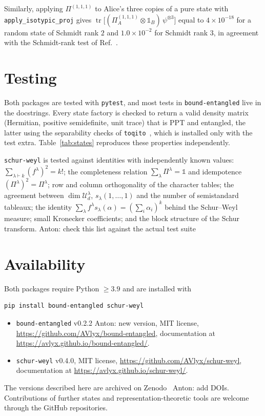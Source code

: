 \documentclass[aps,pra,twocolumn,superscriptaddress,groupedaddress]{revtex4-2}
\newcommand{\one}{\mathds{1}}
\newcommand{\code}[1]{\texttt{#1}}
\DeclareMathOperator{\tr}{tr}
\newcommand{\anton}[1]{{\color{antongreen} Anton: #1}}
\begin{document}
Similarly, applying $\Pi^{(1,1,1)}$ to Alice's three copies of a pure state
with \code{apply\_isotypic\_proj} gives
$\tr\big[(\Pi^{(1,1,1)}_A\otimes\one_B)\,\psi^{\otimes3}\big]$ equal to
$4\times10^{-18}$ for a random state of Schmidt rank $2$ and $1.0\times10^{-2}$
for Schmidt rank $3$, in agreement with the Schmidt-rank test of
Ref.~\cite{Christandl2005}.

\section{Testing}\label{sec:tests}

Both packages are tested with \code{pytest}, and most tests in
\code{bound-entangled} live in the docstrings. Every state factory is checked
to return a valid density matrix (Hermitian, positive semidefinite, unit
trace) that is PPT and entangled, the latter using the separability checks of
\code{toqito}~\cite{toqito}, which is installed only with the test extra.
Table~\ref{tab:states} reproduces these properties independently.

\code{schur-weyl} is tested against identities with independently known
values: $\sum_{\lambda\vdash k}(f^\lambda)^2=k!$; the completeness relation
$\sum_\lambda\Pi^\lambda=\one$ and idempotence $(\Pi^\lambda)^2=\Pi^\lambda$;
row and column orthogonality of the character tables; the agreement between
$\dim\mathcal{U}^\lambda_d$, $s_\lambda(1,\dots,1)$ and the number of
semistandard tableaux; the identity $\sum_\lambda f^\lambda
s_\lambda(\alpha)=(\sum_i\alpha_i)^k$ behind the Schur--Weyl measure; small
Kronecker coefficients; and the block structure of the Schur transform.
\anton{check this list against the actual test suite}

\section{Availability}

Both packages require Python $\ge3.9$ and are installed with
\begin{lstlisting}[language=bash]
pip install bound-entangled schur-weyl
\end{lstlisting}
\begin{itemize}
\item \code{bound-entangled} v0.2.2 \anton{new version}, MIT license,
\url{https://github.com/AVlyx/bound-entangled}, documentation at
\url{https://avlyx.github.io/bound-entangled/}.
\item \code{schur-weyl} v0.4.0, MIT license,
\url{https://github.com/AVlyx/schur-weyl}, documentation at
\url{https://avlyx.github.io/schur-weyl/}.
\end{itemize}
The versions described here are archived on Zenodo~\anton{add DOIs}.
Contributions of further states and representation-theoretic tools are
welcome through the GitHub repositories.
\end{document}
